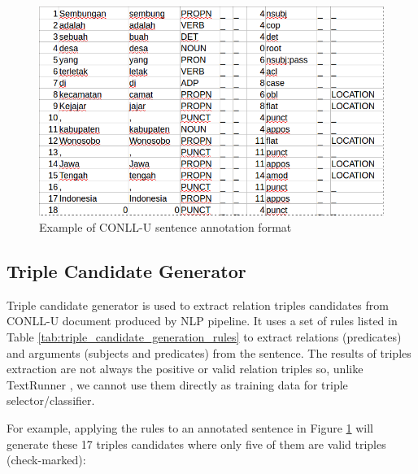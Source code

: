 \begin{figure}
\centering
\includegraphics[scale=0.35]{../images/conllu_example.png}
\caption{Example of CONLL-U sentence annotation format}
\label{fig:conllu_example}
\end{figure}

\subsection{Triple Candidate Generator} \label{Triple Candidate Generator}


Triple candidate generator is used to extract relation triples candidates from CONLL-U document produced by NLP pipeline. It uses a set of rules listed in Table \ref{tab:triple_candidate_generation_rules} to extract relations (predicates) and arguments (subjects and predicates) from the sentence. The results of triples extraction are not always the positive or valid relation triples so, unlike TextRunner \citep{banko2007open}, we cannot use them directly as training data for triple selector/classifier.

For example, applying the rules to an annotated sentence in Figure \ref{fig:conllu_example} will generate these 17 triples candidates where only five of them are valid triples (check-marked):

